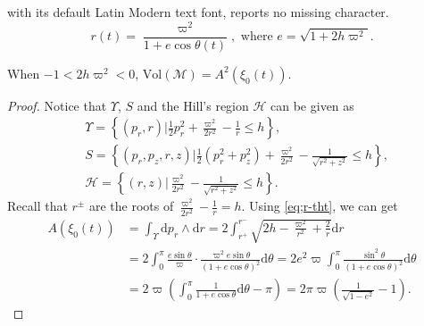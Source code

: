 \documentclass[10pt,a4paper]{amsart}
\newcommand{\om}{\varpi}
\begin{document}
with its default Latin Modern text font, reports no missing character.
\begin{equation} \label{eq;r-tht}
	r(t)=\frac{\om^{2}}{1+e\cos\theta(t)}, \text{ where } e=\sqrt{1+2h\om^{2}}.
\end{equation}

\begin{lemma}\label{lemma:kepler equal}
	 When $-1<2h\om^2<0$, $\text{Vol}(\mathcal{M})=A^{2}(\xi_0(t))$.
\end{lemma}

\begin{proof}
	Notice that $\Upsilon$, $S$ and the Hill's region $\mathcal{H}$ can be given as
	\begin{equation}
		\begin{aligned}
			&\Upsilon=\left\{(p_{r},r)|\frac{1}{2}p_{r}^{2}+\frac{\om^{2}}{2r^{2}}-\frac{1}{r}\leq h \right\},\\
			&S=\left\{(p_{r},p_{z},r ,z)|\frac{1}{2}(p_{r}^{2}+p_{z}^{2})+\frac{\om^{2}}{2r^{2}}-\frac{1}{\sqrt{r^{2}+z^{2}}}\leq h \right\},\\
			&\mathcal{H}=\left\{(r,z)|\frac{\om^{2}}{2r^{2}}-\frac{1}{\sqrt{r^{2}+z^{2}}}\leq h \right\}.
		\end{aligned}
	\end{equation}
	Recall that $r^{\pm}$ are the roots of $\frac{\om^{2}}{2r^{2}}-\frac{1}{r}=h$. Using \eqref{eq;r-tht}, we can get
	\begin{equation}\label{eq:action of Kepler}
		\begin{aligned}
			A(\xi_{0}(t))&=\int_{\Upsilon}\mathrm{d}p_{r}\wedge\mathrm{d}r=2\int_{r^{+}}^{r^{-}}\sqrt{2h-\frac{\om^{2}}{r^{2}}+\frac{2}{r}}\mathrm{d}r\\
			&=2\int_{0}^{\pi}\frac{e\sin\theta}{\om}\cdot\frac{\om^{2}e\sin\theta}{(1+e\cos\theta)^{2}}\mathrm{d}\theta=2e^{2}\om\int_{0}^{\pi}\frac{\sin^{2}\theta}{(1+e\cos\theta)^{2}}\mathrm{d}\theta\\
			&=2\om\left(\int_{0}^{\pi}\frac{1}{1+e\cos\theta}\mathrm{d}\theta-\pi\right)=2\pi\om\left(\frac{1}{\sqrt{1-e^{2}}}-1\right).
		\end{aligned}
	\end{equation}


\end{proof}
\end{document}
